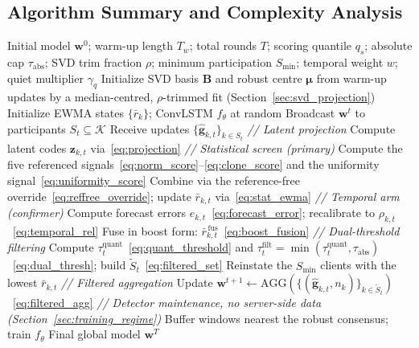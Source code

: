 \documentclass[journal]{IEEEtran}
\begin{document}
\subsection{Algorithm Summary and Complexity Analysis}
\label{sec:complexity}

\begin{algorithm}[t]
\caption{USTAD-FL: Unsupervised Statistical Anomaly Detection at the server}
\label{alg:ustad}
\begin{algorithmic}[1]
\REQUIRE Initial model $\mathbf{w}^{0}$; warm-up length $T_w$; total rounds $T$; scoring quantile $q_s$; absolute cap $\tau_{\mathrm{abs}}$; SVD trim fraction $\rho$; minimum participation $S_{\min}$; temporal weight $w$; quiet multiplier $\gamma_q$
\STATE Initialize SVD basis $\mathbf{B}$ and robust centre $\boldsymbol{\mu}$ from warm-up updates by a median-centred, $\rho$-trimmed fit (Section~\ref{sec:svd_projection})
\STATE Initialize EWMA states $\{\bar r_{k}\}$; ConvLSTM $f_\theta$ at random
    \STATE Broadcast $\mathbf{w}^{t}$ to participants $S_t \subseteq \mathcal{K}$
    \STATE Receive updates $\{\hat{\mathbf{g}}_{k,t}\}_{k\in S_t}$
    \STATE \textit{// Latent projection}
    \STATE Compute latent codes $\mathbf{z}_{k,t}$ via~\eqref{eq:projection}
    \STATE \textit{// Statistical screen (primary)}
    \STATE Compute the five referenced signals~\eqref{eq:norm_score}--\eqref{eq:clone_score} and the uniformity signal~\eqref{eq:uniformity_score}
    \STATE Combine via the reference-free override~\eqref{eq:reffree_override}; update $\bar r_{k,t}$ via~\eqref{eq:stat_ewma}
    \STATE \textit{// Temporal arm (confirmer)}
    \STATE Compute forecast errors $e_{k,t}$~\eqref{eq:forecast_error}; recalibrate to $\rho_{k,t}$~\eqref{eq:temporal_rel}
    \STATE Fuse in boost form: $\bar r^{\,\mathrm{fus}}_{k,t}$~\eqref{eq:boost_fusion}
    \STATE \textit{// Dual-threshold filtering}
    \STATE Compute $\tau_t^{\mathrm{quant}}$~\eqref{eq:quant_threshold} and $\tau_t^{\mathrm{filt}} = \min(\tau_t^{\mathrm{quant}}, \tau_{\mathrm{abs}})$~\eqref{eq:dual_thresh}; build $\widetilde{S}_t$~\eqref{eq:filtered_set}
        \STATE Reinstate the $S_{\min}$ clients with the lowest $\bar r_{k,t}$
    \ENDIF
    \STATE \textit{// Filtered aggregation}
    \STATE Update $\mathbf{w}^{t+1} \!\leftarrow\! \text{AGG}(\{(\hat{\mathbf{g}}_{k,t},n_k)\}_{k\in\widetilde{S}_t})$~\eqref{eq:filtered_agg}
    \STATE \textit{// Detector maintenance, no server-side data (Section~\ref{sec:training_regime})}
        \STATE Buffer windows nearest the robust consensus; train $f_\theta$
    \ENDIF
\ENDFOR
\RETURN Final global model $\mathbf{w}^{T}$
\end{algorithmic}
\end{algorithm}
\end{document}

